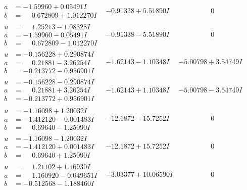 \documentclass[1p]{elsarticle_modified}
\theoremstyle{definition}
\begin{document}
$$\begin{array}{c|c|c}
\begin{aligned}
a &= -1.59960 + 0.05491 I \\
b &= \phantom{-}0.672809 + 1.012270 I\end{aligned}
 & -0.91338 + 5.51890 I & \phantom{-0.000000 } 0 \\ \hline\begin{aligned}
u &= \phantom{-}1.25213 - 1.08328 I \\
a &= -1.59960 - 0.05491 I \\
b &= \phantom{-}0.672809 - 1.012270 I\end{aligned}
 & -0.91338 - 5.51890 I & \phantom{-0.000000 } 0 \\ \hline\begin{aligned}
u &= -0.156228 + 0.290874 I \\
a &= \phantom{-}0.21881 - 3.26254 I \\
b &= -0.213772 - 0.956901 I\end{aligned}
 & -1.62143 - 1.10348 I & -5.00798 + 3.54749 I \\ \hline\begin{aligned}
u &= -0.156228 - 0.290874 I \\
a &= \phantom{-}0.21881 + 3.26254 I \\
b &= -0.213772 + 0.956901 I\end{aligned}
 & -1.62143 + 1.10348 I & -5.00798 - 3.54749 I \\ \hline\begin{aligned}
u &= -1.16098 + 1.20032 I \\
a &= -1.412120 - 0.001483 I \\
b &= \phantom{-}0.69640 - 1.25090 I\end{aligned}
 & -12.1872 - 15.7252 I & \phantom{-0.000000 } 0 \\ \hline\begin{aligned}
u &= -1.16098 - 1.20032 I \\
a &= -1.412120 + 0.001483 I \\
b &= \phantom{-}0.69640 + 1.25090 I\end{aligned}
 & -12.1872 + 15.7252 I & \phantom{-0.000000 } 0 \\ \hline\begin{aligned}
u &= \phantom{-}1.21102 + 1.16930 I \\
a &= \phantom{-}1.160920 - 0.049651 I \\
b &= -0.512568 - 1.188460 I\end{aligned}
 & -3.03377 + 10.06590 I & \phantom{-0.000000 } 0 \\ \hline\begin{aligned}

\end{aligned}
\end{array}$$
\end{document}
